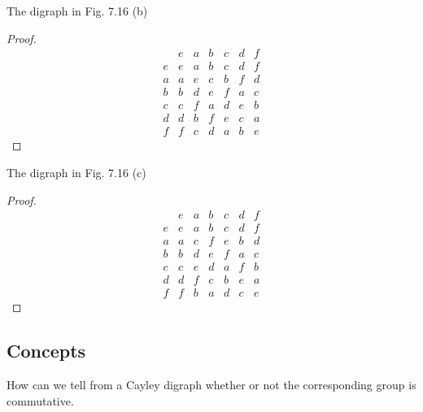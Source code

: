 \newpage
\begin{exercise}
    The digraph in Fig. 7.16 (b)
\end{exercise}

\begin{proof}
    \[
        \begin{array}{c|cccccc}
              & e & a & b & c & d & f \\
            \hline
            e & e & a & b & c & d & f \\
            a & a & e & c & b & f & d \\
            b & b & d & e & f & a & c \\
            c & c & f & a & d & e & b \\
            d & d & b & f & e & c & a \\
            f & f & c & d & a & b & e
        \end{array}
    \]
\end{proof}

\newpage
\begin{exercise}
    The digraph in Fig. 7.16 (c)
\end{exercise}

\begin{proof}
    \[
        \begin{array}{c|cccccc}
              & e & a & b & c & d & f \\
            \hline
            e & e & a & b & c & d & f \\
            a & a & c & f & e & b & d \\
            b & b & d & e & f & a & c \\
            c & c & e & d & a & f & b \\
            d & d & f & c & b & e & a \\
            f & f & b & a & d & c & e
        \end{array}
    \]
\end{proof}

\subsection*{Concepts}

\newpage
\begin{exercise}
    How can we tell from a Cayley digraph whether or not the corresponding group is commutative.
\end{exercise}

